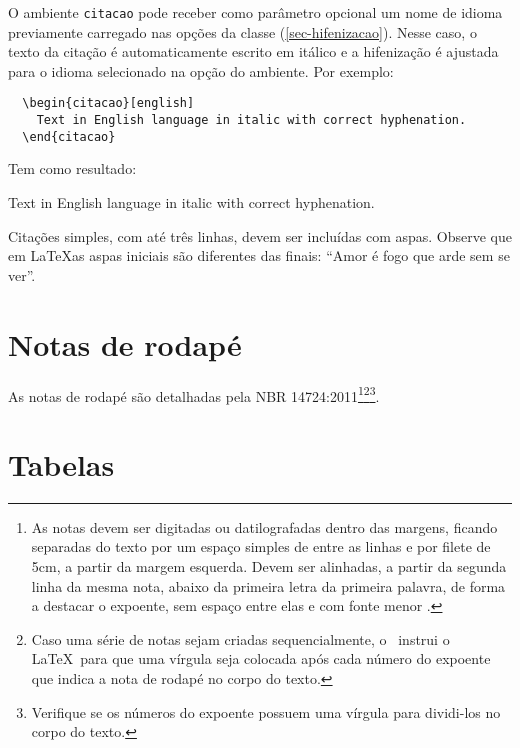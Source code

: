 \documentclass[article,12pt,oneside,a4paper,chapter=TITLE,
			   english,brazil]{abntex2}
\begin{document}
\begin{anexosenv}
O ambiente \texttt{citacao} pode receber como parâmetro opcional um nome de idioma previamente carregado nas opções da classe (\autoref{sec-hifenizacao}). Nesse caso, o texto da citação é automaticamente escrito em itálico e a hifenização é ajustada para o idioma selecionado na opção do ambiente. Por exemplo:
\begin{verbatim}
  \begin{citacao}[english]
    Text in English language in italic with correct hyphenation.
  \end{citacao}
\end{verbatim}

Tem como resultado:
\begin{citacao}[english]
 Text in English language in italic with correct hyphenation.
\end{citacao}

Citações simples, com até três linhas, devem ser incluídas com aspas. Observe que em \LaTeX as aspas iniciais são diferentes das finais: ``Amor é fogo que arde sem se ver''.

\section{Notas de rodapé}

As notas de rodapé são detalhadas pela NBR 14724:2011\footnote{As notas devem ser digitadas ou datilografadas dentro das margens, ficando separadas do texto por um espaço simples de entre as linhas e por filete de 5cm, a partir da margem esquerda. Devem ser alinhadas, a partir da segunda linha da mesma nota, abaixo da primeira letra da primeira palavra, de forma a destacar o expoente, sem espaço entre elas e com fonte menor .}\footnote{Caso uma série de notas sejam criadas sequencialmente, o \abnTeX\ instrui o \LaTeX\ para que uma vírgula seja colocada após cada número do expoente que indica a nota de rodapé no corpo do texto.}\footnote{Verifique se os números do expoente possuem uma vírgula para dividi-los no corpo do texto.}. 


\section{Tabelas}


\end{anexosenv}
\end{document}
